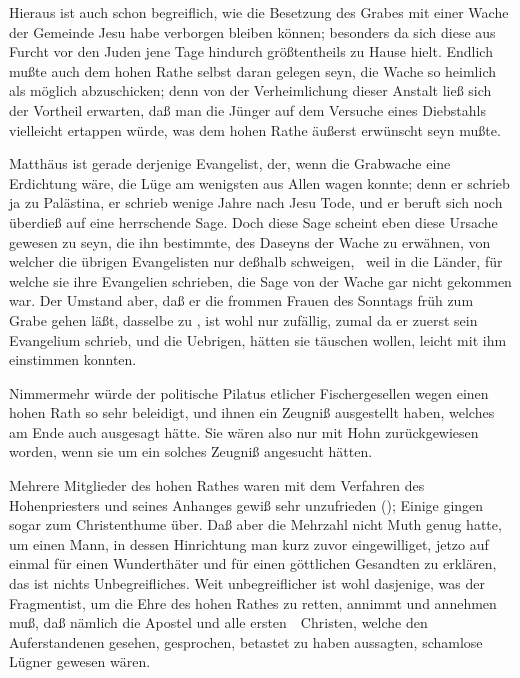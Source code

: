 \begin{aufza}
\begin{RWanm}
\begin{aufzb}
\item Hieraus ist auch schon begreiflich, wie die Besetzung des Grabes mit einer Wache der Gemeinde Jesu habe verborgen bleiben können; besonders da sich diese aus Furcht vor den Juden jene Tage hindurch größtentheils zu Hause hielt. Endlich mußte auch dem hohen Rathe selbst daran gelegen seyn, die Wache so heimlich als möglich abzuschicken; denn von der Verheimlichung dieser Anstalt ließ sich der Vortheil erwarten, daß man die Jünger auf dem Versuche eines Diebstahls vielleicht ertappen würde, was dem hohen Rathe äußerst erwünscht seyn mußte.
\item Matthäus ist gerade derjenige Evangelist, der, wenn die Grabwache eine Erdichtung wäre, die Lüge am wenigsten aus Allen wagen konnte; denn er schrieb ja zu Palästina, er schrieb wenige Jahre nach Jesu Tode, und er beruft sich noch überdieß auf eine herrschende Sage. Doch diese Sage scheint eben diese Ursache gewesen zu seyn, die ihn bestimmte, des Daseyns der Wache zu erwähnen, von welcher die übrigen Evangelisten nur deßhalb schweigen, ~weil in die Länder, für welche sie ihre Evangelien schrieben, die Sage von der Wache gar nicht gekommen war. Der Umstand aber, daß er die frommen Frauen des Sonntags früh zum Grabe gehen läßt, dasselbe zu , ist wohl nur zufällig, zumal da er zuerst sein Evangelium schrieb, und die Uebrigen, hätten sie täuschen wollen, leicht mit ihm einstimmen konnten.
\item Nimmermehr würde der politische Pilatus etlicher Fischergesellen wegen einen hohen Rath so sehr beleidigt, und ihnen ein Zeugniß ausgestellt haben, welches am Ende auch  ausgesagt hätte. Sie wären also nur mit Hohn zurückgewiesen worden, wenn sie um ein solches Zeugniß angesucht hätten.
\item Mehrere Mitglieder des hohen Rathes waren mit dem Verfahren des Hohenpriesters und seines Anhanges gewiß sehr unzufrieden (); Einige gingen sogar zum Christenthume über. Daß aber die Mehrzahl nicht Muth genug hatte, um einen Mann, in dessen Hinrichtung man kurz zuvor eingewilliget, jetzo auf einmal für einen Wunderthäter und für einen göttlichen Gesandten zu erklären, das ist nichts Unbegreifliches. Weit unbegreiflicher ist wohl dasjenige, was der Fragmentist, um die Ehre des hohen Rathes zu retten, annimmt und annehmen muß, daß nämlich die Apostel und alle ersten~\ Christen, welche den Auferstandenen gesehen, gesprochen, betastet zu haben aussagten, schamlose Lügner gewesen wären.
\end{aufzb}
\end{RWanm}


\end{aufza}
